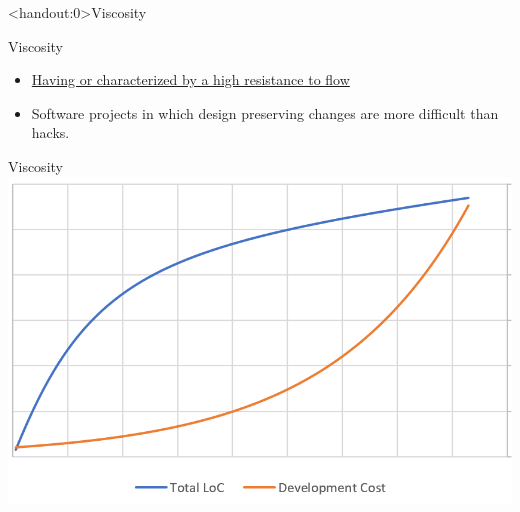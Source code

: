 \documentclass[xcolor=svgnames]{beamer}
\begin{document}

{%
%
\begin{frame}<handout:0>{Viscosity}
\end{frame}
}

{%
%
\begin{frame}{Viscosity}

    \begin{itemize}
        \item \href{https://www.merriam-webster.com/dictionary/viscous}
            {Having or characterized by a high resistance to flow}
        \item<2-> Software projects in which design preserving changes are more
            difficult than hacks.
    \end{itemize}
\end{frame}
}




{%
%
\begin{frame}{Viscosity}
    \includegraphics[height=0.75\paperheight]{viscous_growth}
\end{frame}
}
\end{document}
